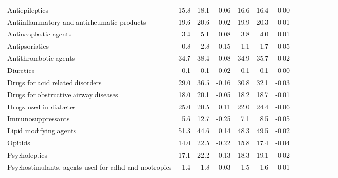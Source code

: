 \documentclass[11pt,]{article}
\begin{document}
\begin{longtable}{lrrrrrrrrrrrr}
      Antiepileptics & 15.8 & 18.1 & -0.06 & 16.6 & 16.4 &  0.00 \\ 
      Antiinflammatory and antirheumatic products & 19.6 & 20.6 & -0.02 & 19.9 & 20.3 & -0.01 \\ 
      Antineoplastic agents &  3.4 &  5.1 & -0.08 &  3.8 &  4.0 & -0.01 \\ 
      Antipsoriatics &  0.8 &  2.8 & -0.15 &  1.1 &  1.7 & -0.05 \\ 
      Antithrombotic agents & 34.7 & 38.4 & -0.08 & 34.9 & 35.7 & -0.02 \\ 
      Diuretics &  0.1 &  0.1 & -0.02 &  0.1 &  0.1 &  0.00 \\ 
      Drugs for acid related disorders & 29.0 & 36.5 & -0.16 & 30.8 & 32.1 & -0.03 \\ 
      Drugs for obstructive airway diseases & 18.0 & 20.1 & -0.05 & 18.2 & 18.7 & -0.01 \\ 
      Drugs used in diabetes & 25.0 & 20.5 &  0.11 & 22.0 & 24.4 & -0.06 \\ 
      Immunosuppressants &  5.6 & 12.7 & -0.25 &  7.1 &  8.5 & -0.05 \\ 
      Lipid modifying agents & 51.3 & 44.6 &  0.14 & 48.3 & 49.5 & -0.02 \\ 
      Opioids & 14.0 & 22.5 & -0.22 & 15.8 & 17.4 & -0.04 \\ 
      Psycholeptics & 17.1 & 22.2 & -0.13 & 18.3 & 19.1 & -0.02 \\ 
      Psychostimulants, agents used for adhd and nootropics &  1.4 &  1.8 & -0.03 &  1.5 &  1.6 & -0.01 \\ 
   \bottomrule\end{longtable}
\clearpage
{}
\end{document}

